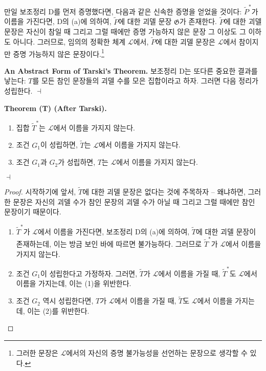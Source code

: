 \documentclass[12pt]{paper}
\newenvironment{context}[1][]
{ \noindent \textbf{{#1}.} }
{ \hfill $ \dashv $ }
\begin{document}
만일 보조정리 D를 먼저 증명했다면, 다음과 같은 신속한 증명을 얻었을 것이다:
$\widetilde{P}^{*}$가 이름을 가진다면, D의 (a)에 의하여, $\widetilde{P}$에 대한 괴델 문장 $\mathfrak{G}$가 존재한다.
$\widetilde{P}$에 대한 괴델 문장은 자신이 참일 때 그리고 그럴 때에만 증명 가능하지 않은 문장 그 이상도 그 이하도 아니다.
그러므로, 임의의 정확한 체계 $\mathcal{L}$에서, $\widetilde{P}$에 대한 괴델 문장은 $\mathcal{L}$에서 참이지만 증명 가능하지 않은 문장이다.\footnote
{
그러한 문장은 $\mathcal{L}$에서의 자신의 증명 불가능성을 선언하는 문장으로 생각할 수 있다.
}

\begin{context}[An Abstract Form of Tarski's Theorem]
보조정리 D는 또다른 중요한 결과를 낳는다:
$T$를 모든 참인 문장들의 괴델 수를 모은 집합이라고 하자.
그러면 다음 정리가 성립한다.
\end{context}

\begin{context}[Theorem (T) (After Tarski)]
\begin{enumerate}
\item 집합 $\widetilde{T}^{*}$는 $\mathcal{L}$에서 이름을 가지지 않는다.
\item 조건 $G_1$이 성립하면, $\widetilde{T}$는 $\mathcal{L}$에서 이름을 가지지 않는다.
\item 조건 $G_1$과 $G_2$가 성립하면, $T$는 $\mathcal{L}$에서 이름을 가지지 않는다.
\end{enumerate}
\end{context}

\begin{proof}
시작하기에 앞서, $\widetilde{T}$에 대한 괴델 문장은 없다는 것에 주목하자 --
왜냐하면, 그러한 문장은 자신의 괴델 수가 참인 문장의 괴델 수가 아닐 때 그리고 그럴 때에만 참인 문장이기 때문이다.
\begin{enumerate}
\item $\widetilde{T}^{*}$가 $\mathcal{L}$에서 이름을 가진다면, 보조정리 D의 (a)에 의하여,
$\widetilde{T}$에 대한 괴델 문장이 존재하는데, 이는 방금 보인 바에 따르면 불가능하다.
그러므로 $\widetilde{T}^{*}$가 $\mathcal{L}$에서 이름을 가지지 않는다.

\item 조건 $G_1$이 성립한다고 가정하자.
그러면, $\widetilde{T}$가 $\mathcal{L}$에서 이름을 가질 때,
$\widetilde{T}^{*}$도 $\mathcal{L}$에서 이름을 가지는데,
이는 (1)을 위반한다.

\item 조건 $G_2$ 역시 성립한다면,
$T$가 $\mathcal{L}$에서 이름을 가질 때,
$\widetilde{T}$도 $\mathcal{L}$에서 이름을 가지는데,
이는 (2)를 위반한다.
\end{enumerate}
\end{proof}
\end{document}
